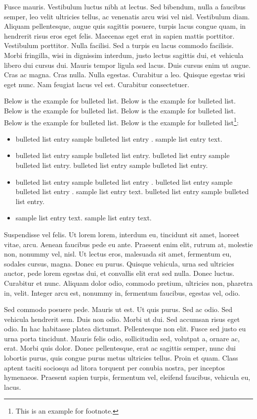 \documentclass{wber}
\begin{document}
Fusce mauris. Vestibulum luctus nibh at lectus. Sed bibendum, nulla a faucibus semper, leo velit ultricies tellus, ac
venenatis arcu wisi vel nisl. Vestibulum diam. Aliquam pellentesque, augue quis sagittis posuere, turpis lacus congue
quam, in hendrerit risus eros eget felis. Maecenas eget erat in sapien mattis porttitor. Vestibulum porttitor. Nulla
facilisi. Sed a turpis eu lacus commodo facilisis. Morbi fringilla, wisi in dignissim interdum, justo lectus sagittis dui, et
vehicula libero dui cursus dui. Mauris tempor ligula sed lacus. Duis cursus enim ut augue. Cras ac magna. Cras nulla.
Nulla egestas. Curabitur a leo. Quisque egestas wisi eget nunc. Nam feugiat lacus vel est. Curabitur consectetuer.


Below is the example \citep{hoel-71-portion} for bulleted list. Below is the example for bulleted list. Below is the example for bulleted list. Below is the example for bulleted list. Below is the example for bulleted list. Below is the example for bulleted list\footnote{This is an example for footnote.}:
\begin{itemize}
\item bulleted list entry sample bulleted list entry \citep{eckstein-zuckerman}. sample list entry text. 
\item bulleted list entry sample bulleted list entry. bulleted list entry sample bulleted list entry. bulleted list entry sample bulleted list entry.
\item bulleted list entry sample bulleted list entry \citep{godfrey-59}. bulleted list entry sample bulleted list entry \citep{ramsbottom-31}. sample list entry text.  bulleted list entry sample bulleted list entry.
\item sample list entry text. sample list entry text.  
\end{itemize}

Suspendisse vel felis. Ut lorem lorem, interdum eu, tincidunt sit amet, laoreet vitae, arcu. Aenean faucibus pede eu
ante. Praesent enim elit, rutrum at, molestie non, nonummy vel, nisl. Ut lectus eros, malesuada sit amet, fermentum
eu, sodales cursus, magna. Donec eu purus. Quisque vehicula, urna sed ultricies auctor, pede lorem egestas dui, et
convallis elit erat sed nulla. Donec luctus. Curabitur et nunc. Aliquam dolor odio, commodo pretium, ultricies non,
pharetra in, velit. Integer arcu est, nonummy in, fermentum faucibus, egestas vel, odio.

Sed commodo posuere pede. Mauris ut est. Ut quis purus. Sed ac odio. Sed vehicula hendrerit sem. Duis non
odio. Morbi ut dui. Sed accumsan risus eget odio. In hac habitasse platea dictumst. Pellentesque non elit. Fusce
sed justo eu urna porta tincidunt. Mauris felis odio, sollicitudin sed, volutpat a, ornare ac, erat. Morbi quis dolor. Donec pellentesque, erat ac sagittis semper, nunc dui lobortis purus, quis congue purus metus ultricies tellus. Proin
et quam. Class aptent taciti sociosqu ad litora torquent per conubia nostra, per inceptos hymenaeos. Praesent sapien
turpis, fermentum vel, eleifend faucibus, vehicula eu, lacus.
\end{document}

